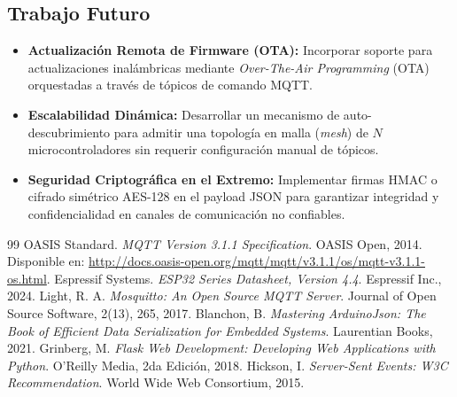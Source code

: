 \documentclass[11pt,a4paper]{article}
\begin{document}
\subsection{Trabajo Futuro}
\begin{itemize}
    \item \textbf{Actualización Remota de Firmware (OTA):} Incorporar soporte para actualizaciones inalámbricas mediante \textit{Over-The-Air Programming} (OTA) orquestadas a través de tópicos de comando MQTT.
    \item \textbf{Escalabilidad Dinámica:} Desarrollar un mecanismo de auto-descubrimiento para admitir una topología en malla (\textit{mesh}) de $N$ microcontroladores sin requerir configuración manual de tópicos.
    \item \textbf{Seguridad Criptográfica en el Extremo:} Implementar firmas HMAC o cifrado simétrico AES-128 en el payload JSON para garantizar integridad y confidencialidad en canales de comunicación no confiables.
\end{itemize}

\newpage
\begin{thebibliography}{99}
     OASIS Standard. \textit{MQTT Version 3.1.1 Specification}. OASIS Open, 2014. Disponible en: \url{http://docs.oasis-open.org/mqtt/mqtt/v3.1.1/os/mqtt-v3.1.1-os.html}.
     Espressif Systems. \textit{ESP32 Series Datasheet, Version 4.4}. Espressif Inc., 2024.
     Light, R. A. \textit{Mosquitto: An Open Source MQTT Server}. Journal of Open Source Software, 2(13), 265, 2017.
     Blanchon, B. \textit{Mastering ArduinoJson: The Book of Efficient Data Serialization for Embedded Systems}. Laurentian Books, 2021.
     Grinberg, M. \textit{Flask Web Development: Developing Web Applications with Python}. O'Reilly Media, 2da Edición, 2018.
     Hickson, I. \textit{Server-Sent Events: W3C Recommendation}. World Wide Web Consortium, 2015.
\end{thebibliography}
\end{document}
